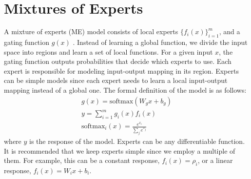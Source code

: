 \documentclass[a4paper,onesided,12pt]{report}
\begin{document}
\section{Mixtures of Experts}
\label{sec:me}
A mixture of experts (ME) model consists of local experts $\{f_i(x)\}_{i=1}^{m}$, and a gating function $g(x)$ \cite{me}. Instead of learning a global function, we divide the input space into regions and learn a set of local functions. For a given input $x$, the gating function outputs probabilities that decide which experts to use. Each expert is responsible for modeling input-output mapping in its region. Experts can be simple models since each expert needs to learn a local input-output mapping instead of a global one. The formal definition of the model is as follows:
\begin{gather}
g(x) = \text{softmax}(W_g x + b_g)\\
y = \sum_{i=1}^m g_i(x) f_i(x)\\
\text{softmax}_i(x) = \frac{e^{x_i}}{\sum_j e^{x_j}}
\end{gather}
where $y$ is the response of the model. Experts can be any differentiable function. It is recommended that we keep experts simple since we employ a multiple of them. For example, this can be a constant response, $f_i(x)=\rho_i$, or a linear response, $f_i(x)=W_i x + b_i$.
%
\end{document}
